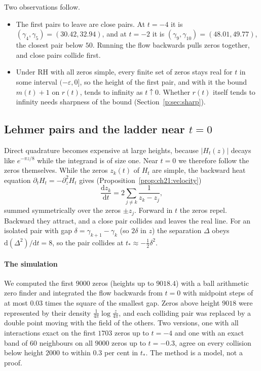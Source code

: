 Two observations follow.
\begin{itemize}
\item The first pairs to leave are close pairs. At $t=-4$ it is $(\gamma_4,\gamma_5)=(30.42,32.94)$, and at $t=-2$ it is $(\gamma_9,\gamma_{10})=(48.01,49.77)$, the closest pair below $50$. Running the flow backwards pulls zeros together, and close pairs collide first.
\item Under RH with all zeros simple, every finite set of zeros stays real for $t$ in some interval $(-\varepsilon,0]$, so the height of the first pair, and with it the bound $m(t)+1$ on $r(t)$, tends to infinity as $t\uparrow0$. Whether $r(t)$ itself tends to infinity needs sharpness of the bound (Section~\ref{p:sec:sharp}).
\end{itemize}

\subsection{Lehmer pairs and the ladder near \texorpdfstring{$t=0$}{t = 0}}\label{p:sec:lehmer}

Direct quadrature becomes expensive at large heights, because $|H_t(z)|$ decays like $e^{-\pi z/8}$ while the integrand is of size one. Near $t=0$ we therefore follow the zeros themselves. While the zeros $z_k(t)$ of $H_t$ are simple, the backward heat equation $\partial_tH_t=-\partial_z^2H_t$ gives (Proposition~\ref{prop:ch21:velocity})
\[
\frac{\mathrm dz_k}{\mathrm dt}=2\sum_{j\ne k}\frac{1}{z_k-z_j},
\]
summed symmetrically over the zeros $\pm z_j$. Forward in $t$ the zeros repel. Backward they attract, and a close pair collides and leaves the real line. For an isolated pair with gap $\delta=\gamma_{k+1}-\gamma_k$ (so $2\delta$ in $z$) the separation $\Delta$ obeys $\mathrm d(\Delta^2)/\mathrm dt=8$, so the pair collides at $t_*\approx-\frac12\delta^2$.

\paragraph{The simulation} We computed the first $9000$ zeros (heights up to $9018.4$) with a ball arithmetic zero finder and integrated the flow backwards from $t=0$ with midpoint steps of at most $0.03$ times the square of the smallest gap. Zeros above height $9018$ were represented by their density $\frac1{4\pi}\log\frac z{4\pi}$, and each colliding pair was replaced by a double point moving with the field of the others. Two versions, one with all interactions exact on the first $1703$ zeros up to $t=-4$ and one with an exact band of $60$ neighbours on all $9000$ zeros up to $t=-0.3$, agree on every collision below height $2000$ to within $0.3$ per cent in $t_*$. The method is a model, not a proof. %


